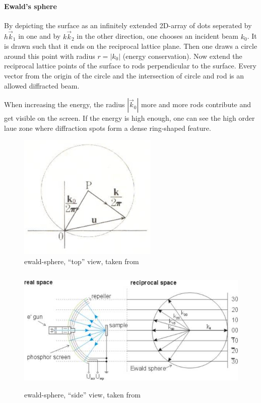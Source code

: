 \paragraph{Ewald's sphere}
By depicting the surface as an infinitely extended 2D-array of dots seperated by $h\vec k_1$ in one and by $k\vec k_2$ in the other direction, one chooses an incident beam $k_0$. It is drawn such that it ends on the reciprocal lattice plane. Then one draws a circle around this point with radius $r=|k_0|$ (energy conservation). Now extend the reciprocal lattice points of the surface to rods perpendicular to the surface. Every vector from the origin of the circle and the intersection of circle and rod is an allowed diffracted beam. 

When increasing the energy, the radius $|\vec k_0|$ more and more rods contribute and get visible on the screen. If the energy is high enough, one can see the high order laue zone where diffraction spots form a dense ring-shaped feature.
\begin{figure}[h!]\label{ewald-sphere}
 \centering
 \includegraphics[height=6cm]{./images/ewald-sphere.jpg}
 \caption{ewald-sphere, ``top'' view, taken from \cite[109]{cowley_diffraction_1981}}
\end{figure}

\begin{figure}[h!]\label{LEED}
 \centering
 \includegraphics[height=6cm]{./images/ThreeGridLeed.jpg}
 \caption{ewald-sphere, ``side'' view, taken from \cite{threegridleed.jpg_2015}}
\end{figure}

